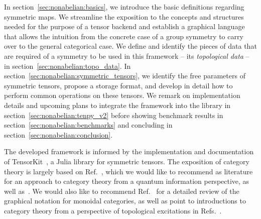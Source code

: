 In section~\ref{sec:nonabelian:basics}, we introduce the basic definitions regarding symmetric maps.
%
We streamline the exposition to the concepts and structures needed for the purpose of a tensor backend and establish a graphical language that allows the intuition from the concrete case of a group symmetry to carry over to the general categorical case.
%
We define and identify the pieces of data that are required of a symmetry to be used in this framework -- its \emph{topological data} -- in section~\ref{sec:nonabelian:topo_data}.
%
In section~\ref{sec:nonabelian:symmetric_tensors}, we identify the free parameters of symmetric tensors, propose a storage format, and develop in detail how to perform common operations on these tensors.
%
We remark on implementation details and upcoming plans to integrate the framework into the  library in section~\ref{sec:nonabelian:tenpy_v2} before showing benchmark results in section~\ref{sec:nonabelian:benchmarks} and concluding in section~\ref{sec:nonabelian:conclusion}.


The developed framework is informed by the implementation and documentation of TensorKit~\cite{tensorkit-docs}, a Julia library for symmetric tensors.
%
The exposition of category theory is largely based on Ref.~\cite{heunen2019}, which we would like to recommend as literature for an approach to category theory from a quantum information perspective, as well as~\cite{simon2023, etingof2015}.
%
We would also like to recommend Ref.~\cite{selinger2011} for a detailed review of the graphical notation for monoidal categories, as well as point to introductions to category theory from a perspective of topological excitations in Refs.~\cite{bultinck2017, kong2022}.
